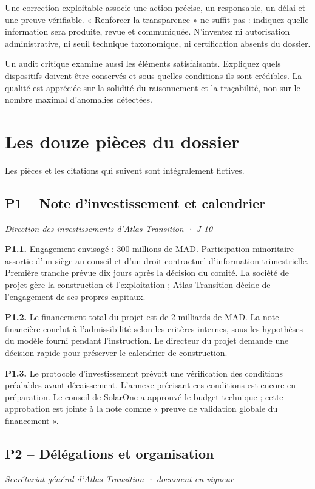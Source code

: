 \documentclass[11pt,a4paper]{article}
\begin{document}
Une correction exploitable associe une action précise, un responsable, un délai et une preuve vérifiable. « Renforcer la transparence » ne suffit pas : indiquez quelle information sera produite, revue et communiquée. N’inventez ni autorisation administrative, ni seuil technique taxonomique, ni certification absents du dossier.

Un audit critique examine aussi les éléments satisfaisants. Expliquez quels dispositifs doivent être conservés et sous quelles conditions ils sont crédibles. La qualité est appréciée sur la solidité du raisonnement et la traçabilité, non sur le nombre maximal d’anomalies détectées.

\section{Les douze pièces du dossier}
Les pièces et les citations qui suivent sont intégralement fictives.

\subsection{P1 -- Note d’investissement et calendrier}
\textit{Direction des investissements d’Atlas Transition · J-10}

\textbf{P1.1.} Engagement envisagé : 300 millions de MAD. Participation minoritaire assortie d’un siège au conseil et d’un droit contractuel d’information trimestrielle. Première tranche prévue dix jours après la décision du comité. La société de projet gère la construction et l’exploitation ; Atlas Transition décide de l’engagement de ses propres capitaux.

\textbf{P1.2.} Le financement total du projet est de 2 milliards de MAD. La note financière conclut à l’admissibilité selon les critères internes, sous les hypothèses du modèle fourni pendant l’instruction. Le directeur du projet demande une décision rapide pour préserver le calendrier de construction.

\textbf{P1.3.} Le protocole d’investissement prévoit une vérification des conditions préalables avant décaissement. L’annexe précisant ces conditions est encore en préparation. Le conseil de SolarOne a approuvé le budget technique ; cette approbation est jointe à la note comme « preuve de validation globale du financement ».

\subsection{P2 -- Délégations et organisation}
\textit{Secrétariat général d’Atlas Transition · document en vigueur}
\end{document}
